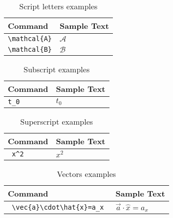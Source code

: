 \documentclass[a4paper,12pt,titlepage]{article}
\begin{document}
\begin{table}[H]
\center
	\begin{tabular}{l|l}
	\hline
	\textbf{Command} & \textbf{Sample Text} \\
	\hline
	\hline
	
	\verb|\mathcal{A}| & $\mathcal{A}$ \\
	\verb|\mathcal{B}| & $\mathcal{B}$ \\
	\end{tabular}
	\caption{Script letters examples}
\end{table}

\begin{table}[H]
\center
	\begin{tabular}{l|l}
	\hline
	\textbf{Command} & \textbf{Sample Text} \\
	\hline
	\hline
	
	\verb|t_0| & $t_0$ \\
	\end{tabular}
	\caption{Subscript examples}
\end{table}


\begin{table}[H]
\center
	\begin{tabular}{l|l}
	\hline
	\textbf{Command} & \textbf{Sample Text} \\
	\hline
	\hline
	
	\verb| x^2 | & $ x^2 $ \\
	\end{tabular}
	\caption{Superscript examples}
\end{table}


\begin{table}[H]
\center
	\begin{tabular}{l|l}
	\hline
	\textbf{Command} & \textbf{Sample Text} \\
	\hline
	\hline
	
	\verb| \vec{a}\cdot\hat{x}=a_x | & $ \vec{a}\cdot\hat{x}=a_x $ \\
	\end{tabular}
	\caption{Vectors examples}
\end{table}
\end{document}
